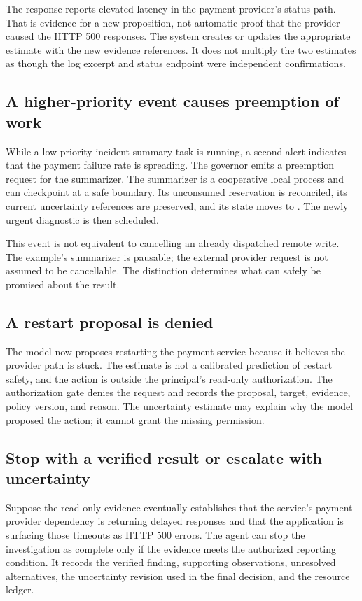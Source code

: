 The response reports elevated latency in the payment provider's status path. That is evidence for a new proposition, not automatic proof that the provider caused the HTTP 500 responses. The system creates or updates the appropriate estimate with the new evidence references. It does not multiply the two estimates as though the log excerpt and status endpoint were independent confirmations.

\subsection{A higher-priority event causes \texorpdfstring{\gls{preemption}}{preemption} of work}

While a low-priority incident-summary task is running, a second alert indicates that the payment failure rate is spreading. The governor emits a preemption request for the summarizer. The summarizer is a cooperative local process and can checkpoint at a safe boundary. Its unconsumed reservation is reconciled, its current uncertainty references are preserved, and its state moves to \texttt{}. The newly urgent diagnostic is then scheduled.

This event is not equivalent to cancelling an already dispatched remote write. The example's summarizer is pausable; the external provider request is not assumed to be cancellable. The distinction determines what can safely be promised about the result.

\subsection{A restart proposal is denied}

The model now proposes restarting the payment service because it believes the provider path is stuck. The estimate is not a calibrated prediction of restart safety, and the action is outside the principal's read-only authorization. The authorization gate denies the request and records the proposal, target, evidence, policy version, and reason. The uncertainty estimate may explain why the model proposed the action; it cannot grant the missing permission.

\subsection{Stop with a verified result or escalate with uncertainty}

Suppose the read-only evidence eventually establishes that the service's payment-provider dependency is returning delayed responses and that the application is surfacing those timeouts as HTTP 500 errors. The agent can stop the investigation as complete only if the evidence meets the authorized reporting condition. It records the verified finding, supporting observations, unresolved alternatives, the uncertainty revision used in the final decision, and the resource ledger.

